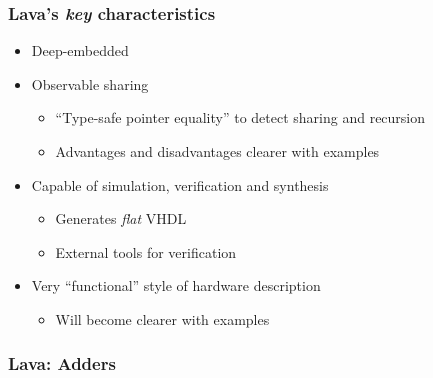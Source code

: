         \begin{frame}
            \frametitle{Lava's \emph{key} characteristics}

            \begin{itemize}
                \item Deep-embedded
                \item Observable sharing
                    \begin{itemize}
                        \item ``Type-safe pointer equality'' to detect sharing and recursion
                        \item Advantages and disadvantages clearer with examples
                    \end{itemize}
                \item Capable of simulation, verification and synthesis
                    \begin{itemize}
                        \item Generates \emph{flat} VHDL
                        \item External tools for verification
                    \end{itemize}
                \item Very ``functional'' style of hardware description
                    \begin{itemize}
                        \item Will become clearer with examples
                    \end{itemize}
            \end{itemize}
        \end{frame}

        \begin{frame}
            \frametitle{Lava: Adders}
        \end{frame}

